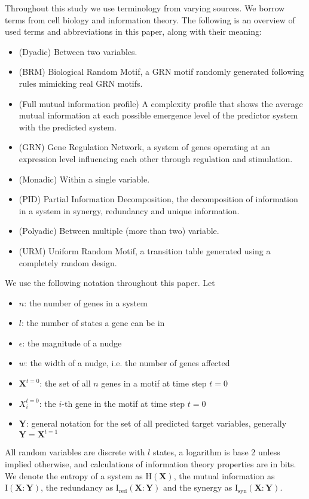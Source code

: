 \documentclass[../main.tex]{subfiles}
\begin{document}
Throughout this study we use terminology from varying sources.
We borrow terms from cell biology and information theory.
The following is an overview of used terms and abbreviations in this paper, along with their meaning:

\begin{itemize}
\item[] (Dyadic) Between two variables.
\item[] (BRM) Biological Random Motif, a GRN motif randomly generated following rules mimicking real GRN motifs.
\item[] (Full mutual information profile) A complexity profile that shows the average mutual information at each possible emergence level of the predictor system with the predicted system.
\item[] (GRN) Gene Regulation Network, a system of genes operating at an expression level influencing each other through regulation and stimulation.
\item[] (Monadic) Within a single variable.
\item[] (PID) Partial Information Decomposition, the decomposition of information in a system in synergy, redundancy and unique information.
\item[] (Polyadic) Between multiple (more than two) variable.
\item[] (URM) Uniform Random Motif, a transition table generated using a completely random design.
\end{itemize}

We use the following notation throughout this paper. Let
\begin{itemize}
\item[] $n$: the number of genes in a system
\item[] $l$: the number of states a gene can be in
\item[] $\epsilon$: the magnitude of a nudge
\item[] $w$: the width of a nudge, i.e. the number of genes affected
\item[] $\mathbf{X}^{t=0}$: the set of all $n$ genes in a motif at time step $t=0$
\item[] $X_i^{t=0}$: the $i$-th gene in the motif at time step $t=0$
\item[] $\mathbf{Y}$: general notation for the set of all predicted target variables, generally $\mathbf{Y} = \mathbf{X}^{t=1}$
\end{itemize}
All random variables are discrete with $l$ states, a logarithm is base 2 unless implied otherwise, and calculations of information theory properties are in bits.
We denote the entropy of a system as $\mathrm{H}(\mathbf{X})$, the mutual information as $\mathrm{I}(\mathbf{X}:\mathbf{Y})$, the redundancy as $\mathrm{I}_\mathrm{red}(\mathbf{X}:\mathbf{Y})$ and the synergy as $\mathrm{I}_\mathrm{syn}(\mathbf{X}:\mathbf{Y})$.
\end{document}
